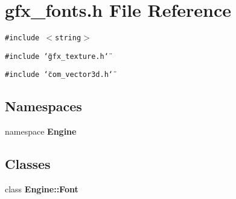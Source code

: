 \section{gfx\_\-fonts.h File Reference}
\label{gfx__fonts_8h}
{\tt \#include $<$string$>$}\par
{\tt \#include \char`\"{}gfx\_\-texture.h\char`\"{}}\par
{\tt \#include \char`\"{}com\_\-vector3d.h\char`\"{}}\par
\subsection*{Namespaces}
\begin{CompactItemize}
\item 
namespace {\bf Engine}
\end{CompactItemize}
\subsection*{Classes}
\begin{CompactItemize}
\item 
class {\bf Engine::Font}
\end{CompactItemize}
